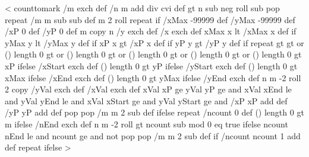 <{%
  counttomark /m exch def
  /n m \psk@plotNoMax{} add div cvi def
  \psk@plotNoMax{} gt {%
    n {
      \psk@plotNoMax\space \psk@plotNo{} sub neg roll %
      \psk@plotNoMax{} sub { pop } repeat %
      /m m \psk@plotNoMax{} sub sub def
      m 2 roll
    } repeat
  } if %
  /xMax -99999 def /yMax -99999 def
  /xP 0 def /yP 0 def
  m copy
  n {
    /y exch def /x exch def
    xMax x lt { /xMax x def } if
    yMax y lt {/yMax y def } if
    xP x gt { /xP x def } if
    yP y gt { /yP y def } if
  } repeat
  \psk@xStep{} gt \psk@yStep{} gt or (\psk@xStart) length 0 gt or
  (\psk@yStart) length 0 gt or (\psk@xEnd) length 0 gt or (\psk@yEnd) length 0 gt or {
%
    (\psk@xStart) length 0 gt {\psk@xStart\space }{ xP } ifelse /xStart exch def
    (\psk@yStart) length 0 gt {\psk@yStart\space }{ yP } ifelse /yStart exch def
    (\psk@xEnd) length 0 gt { \psk@xEnd\space }{ xMax } ifelse /xEnd exch def
    (\psk@yEnd) length 0 gt { \psk@yEnd\space }{ yMax } ifelse /yEnd exch def
    n {
      m -2 roll
      2 copy /yVal exch def /xVal exch def
      xVal xP ge
      yVal yP ge and
      xVal xEnd le and
      yVal yEnd le and
      xVal xStart ge and
      yVal yStart ge and {
        /xP xP \psk@xStep\space add def
        /yP yP \psk@yStep\space add def
      }{%
        pop pop
        /m m 2 sub def
      } ifelse
    } repeat
  }{%
    /ncount 0 def
    (\psk@nEnd) length 0 gt { \psk@nEnd\space }{ m } ifelse 
    /nEnd exch def
    n {
      m -2 roll
      \psk@nStep{} gt {
        ncount \psk@nStart\space sub \psk@nStep\space mod 0 eq }{ true } ifelse
        ncount nEnd le and
        ncount \psk@nStart\space ge and not {
          pop pop
          /m m 2 sub def
        } if
        /ncount ncount 1 add def
      } repeat
  } ifelse
}>
%

